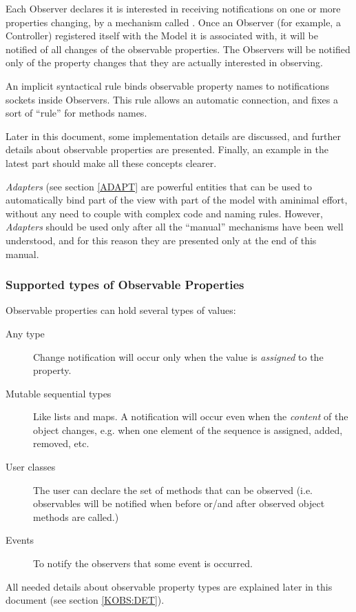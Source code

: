 Each Observer declares it is interested in receiving notifications on
one or more properties changing, by a mechanism called
. Once an Observer (for example, a Controller)
registered itself with the Model it is associated with, it will be
notified of all changes of the observable properties. The Observers
will be notified only of the property changes that they are actually
interested in observing.

An implicit syntactical rule binds observable property names to
notifications sockets inside Observers. This rule allows an automatic
connection, and fixes a sort of ``rule'' for methods names.

Later in this document, some implementation details are discussed, and
further details about observable properties are presented. Finally,
an example in the latest part should make all these concepts clearer.

\emph{Adapters} (see section \ref{ADAPT} are powerful entities that
can be used to automatically bind part of the view with part of the
model with aminimal effort, without any need to couple with complex
code and naming rules. However, \emph{Adapters} should be used only
after all the ``manual'' mechanisms have been well understood, and
for this reason they are presented only at the end of this manual.


\subsubsection{\label{KOBS} Supported types of Observable Properties}

Observable properties can hold several types of values:

\begin{description}
\item [Any type] Change notification will occur only when the value is
  \emph{assigned} to the property.

\item [Mutable sequential types] Like lists and maps. A notification
  will occur even when the \emph{content} of the object changes, e.g.
  when one element of the sequence is assigned, added, removed, etc.
 
\item [User classes] The user can declare the set of methods that can
  be observed (i.e. observables will be notified when before or/and
  after observed object methods are called.) 

\item [Events] To notify the observers that some event is occurred.
\end{description}

All needed details about observable property types are explained later
in this document (see section \ref{KOBS:DET}).
